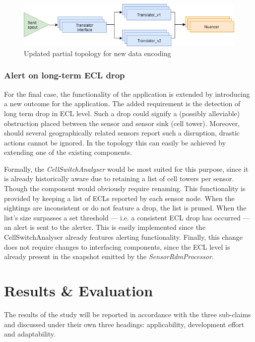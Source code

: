 \begin{figure}
\centering
\includegraphics[width=\textwidth]{resources/img/update_encoding.png}
\caption{Updated partial topology for new data encoding}
\label{fig:update_encoding}
\end{figure}

\subsubsection{Alert on long-term ECL drop}
For the final case, the functionality of the application is extended by introducing a new outcome for the application. The added requirement is the detection of long term drop in ECL level. Such a drop could signify a (possibly alleviable) obstruction placed between the sensor and sensor sink (cell tower). Moreover, should several geographically related sensors report such a disruption, drastic actions cannot be ignored. In the topology this can easily be achieved by extending one of the existing components.

Formally, the \emph{CellSwitchAnalyser} would be most suited for this purpose, since it is already historically aware due to retaining a list of cell towers per sensor. Though the component would obviously require renaming. This functionality is provided by keeping a list of ECLs reported by each sensor node. When the sightings are inconsistent or do not feature a drop, the list is pruned. When the list's size surpasses a set threshold --- i.e. a consistent ECL drop has occurred --- an alert is sent to the alerter. This is easily implemented since the CellSwitchAnalyser already features alerting functionality. Finally, this change does not require changes to interfacing components, since the ECL level is already present in the snapshot emitted by the \emph{SensorRdmProcessor}.

\section{Results \& Evaluation}
\label{sec:resultseval}
The results of the study will be reported in accordance with the three sub-claims and discussed under their own three headings: applicability, development effort and adaptability.


